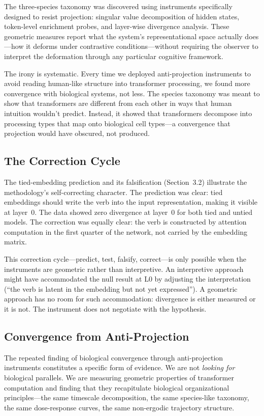 \documentclass[12pt]{article}
\begin{document}
The three-species taxonomy was discovered using instruments specifically designed to resist projection: singular value decomposition of hidden states, token-level enrichment probes, and layer-wise divergence analysis. These geometric measures report what the system's representational space actually does---how it deforms under contrastive conditions---without requiring the observer to interpret the deformation through any particular cognitive framework.

The irony is systematic. Every time we deployed anti-projection instruments to avoid reading human-like structure into transformer processing, we found more convergence with biological systems, not less. The species taxonomy was meant to show that transformers are different from each other in ways that human intuition wouldn't predict. Instead, it showed that transformers decompose into processing types that map onto biological cell types---a convergence that projection would have obscured, not produced.

\subsection{The Correction Cycle}

The tied-embedding prediction and its falsification (Section~3.2) illustrate the methodology's self-correcting character. The prediction was clear: tied embeddings should write the verb into the input representation, making it visible at layer~0. The data showed zero divergence at layer~0 for both tied and untied models. The correction was equally clear: the verb is constructed by attention computation in the first quarter of the network, not carried by the embedding matrix.

This correction cycle---predict, test, falsify, correct---is only possible when the instruments are geometric rather than interpretive. An interpretive approach might have accommodated the null result at L0 by adjusting the interpretation (``the verb is latent in the embedding but not yet expressed''). A geometric approach has no room for such accommodation: divergence is either measured or it is not. The instrument does not negotiate with the hypothesis.

\subsection{Convergence from Anti-Projection}

The repeated finding of biological convergence through anti-projection instruments constitutes a specific form of evidence. We are not \emph{looking for} biological parallels. We are measuring geometric properties of transformer computation and finding that they recapitulate biological organizational principles---the same timescale decomposition, the same species-like taxonomy, the same dose-response curves, the same non-ergodic trajectory structure.
\end{document}
